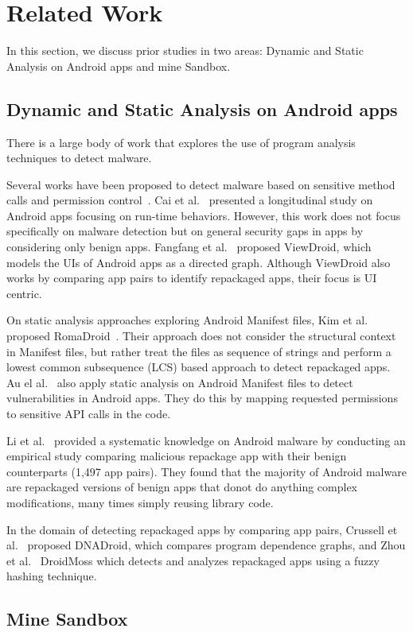 \section{Related Work}\label{sec:relatedwork}
In this section, we discuss prior studies in two areas: Dynamic and Static Analysis on Android apps and mine Sandbox.

\subsection{Dynamic and Static Analysis on Android apps}\label{sec:analysis}

There is a large body of work that explores the use of program analysis techniques to detect malware. 

Several works have been proposed to detect malware based on sensitive method calls and permission control~\cite{DBLP:conf/mobicom/WeiGNF12,DBLP:conf/asiajcis/WuMWLW12,DBLP:conf/sp/LiDLDG21}. Cai et al.~\cite{DBLP:journals/tse/CaiR21} presented a longitudinal study on Android apps focusing on run-time behaviors. However, this work does not focus specifically on malware detection but on general security gaps in apps by considering only benign apps. Fangfang et al.~\cite{DBLP:conf/wisec/ZhangHZW014} proposed ViewDroid, which models the UIs of Android apps as a directed graph. Although ViewDroid also works by comparing app pairs to identify repackaged apps, their focus is UI centric.

On static analysis approaches exploring Android Manifest files, Kim et al. proposed RomaDroid~\cite{DBLP:journals/access/KimLCP19}.  Their approach does not consider the structural context in Manifest files, but rather treat the files as sequence of strings and perform a lowest common subsequence (LCS) based approach to detect repackaged apps. Au el al.~\cite{DBLP:conf/ccs/AuZHL12} also apply static analysis on Android Manifest files to detect vulnerabilities in Android apps. They do this by mapping requested permissions to sensitive API calls in the code.

Li et al.~\cite{DBLP:journals/tifs/0029LBKTLC17} provided a systematic knowledge on Android malware by conducting an empirical study comparing malicious repackage app with their benign counterparts (1,497 app pairs). They found that the majority of Android malware are repackaged versions of benign apps that donot do anything complex modifications, many times simply reusing library code.

 In the domain of detecting repackaged apps by comparing app pairs, Crussell et al.~\cite{DBLP:conf/esorics/CrussellGC12} proposed  DNADroid, which compares program dependence graphs, and Zhou et al.~\cite{DBLP:conf/codaspy/ZhouZJN12} DroidMoss which detects and analyzes repackaged apps using a fuzzy hashing technique.


\subsection{Mine Sandbox}\label{sec:mineSandbox}

